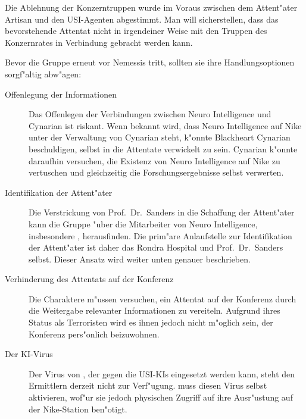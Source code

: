 \begin{remarks}
	Die Ablehnung der Konzerntruppen wurde im Voraus zwischen dem Attent"ater Artisan und den USI-Agenten abgestimmt. Man will sicherstellen, dass das bevorstehende Attentat nicht in irgendeiner Weise mit den Truppen des Konzernrates in Verbindung gebracht werden kann.
\end{remarks}


Bevor die Gruppe erneut vor Nemessis tritt, sollten sie ihre Handlungsoptionen sorgf"altig abw"agen:

\begin{description}
	\item[Offenlegung der Informationen] Das Offenlegen der Verbindungen zwischen Neuro Intelligence und Cynarian ist riskant. Wenn bekannt 
		wird, dass Neuro Intelligence auf Nike unter der Verwaltung von Cynarian steht, k"onnte Blackheart Cynarian beschuldigen, selbst in die Attentate verwickelt zu sein. Cynarian k"onnte daraufhin versuchen, die Existenz von Neuro Intelligence auf Nike zu vertuschen und gleichzeitig die Forschungsergebnisse selbst verwerten.
	\item[Identifikation der Attent"ater] Die Verstrickung von Prof.~Dr.~Sanders in die Schaffung der Attent"ater kann die Gruppe "uber die 
		Mitarbeiter von Neuro Intelligence, insbesondere \ml{}, herausfinden. Die prim"are Anlaufstelle zur Identifikation der Attent"ater ist daher das Rondra Hospital und Prof.~Dr.~Sanders selbst. Dieser Ansatz wird weiter unten genauer beschrieben.		
	\item[Verhinderung des Attentats auf der Konferenz] Die Charaktere m"ussen versuchen, ein Attentat auf der Konferenz durch die 
		Weitergabe relevanter Informationen zu vereiteln. Aufgrund ihres Status als Terroristen wird es ihnen jedoch nicht m"oglich sein, der Konferenz pers"onlich beizuwohnen.
	\item[Der KI-Virus] Der Virus von \ml{}, der gegen die USI-KIs eingesetzt werden kann, steht den Ermittlern derzeit nicht zur 
		Verf"ugung. \ml{} muss diesen Virus selbst aktivieren, wof"ur sie jedoch physischen Zugriff auf ihre Ausr"ustung auf der Nike-Station ben"otigt.
\end{description}

